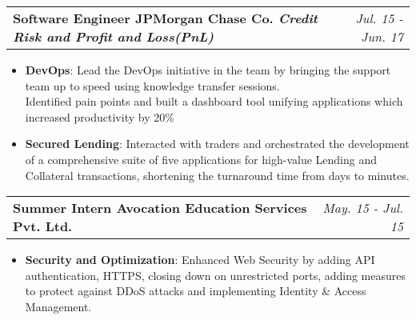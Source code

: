 \documentclass[a4paper,10pt]{article}
\makeatletter
\newcommand{\resumeItem}[2]{
  \vspace{-0.5pt} \item\small{
    \textbf{#1}{: #2}
  }
}
\newcommand{\resumeSubheading}[3]{
	\item
	\textbf{#2} \textbar{} \textbf{#1} \hfill \textit{#3}
}
\newcommand{\projectHeading}[2]{
  \item
    \begin{tabular*}{0.97\textwidth}{l@{\extracolsep{\fill}}r}
      \large{\textbf{#1}} & \textit{\small #2} \\
    \end{tabular*}\vspace{-1.5pt}
}
\newcommand{\resumeItemListStart}{\vspace{-1pt}\begin{itemize}[leftmargin=*]\setlength\itemsep{.5pt}}
\newcommand{\resumeItemListEnd}{\end{itemize}}
\makeatother
\begin{document}
  
    \projectHeading
      {Software Engineer \textbar{} JPMorgan Chase Co. \textbar{} \textit{\small Credit Risk and Profit and Loss(PnL)}}
     {Jul. 15 - Jun. 17}
      \resumeItemListStart
        \resumeItem{DevOps}
        {Lead the DevOps initiative in the team by bringing the support team up to speed using knowledge transfer sessions. \\
        Identified pain points and built a dashboard tool unifying applications which increased productivity by 20\%}
        \resumeItem{Secured Lending}
          {Interacted with traders and orchestrated the development of a comprehensive suite of five applications for high-value Lending and Collateral transactions, shortening the turnaround time from days to minutes.}
      \resumeItemListEnd
      
   
    \projectHeading{Summer Intern \textbar{} Avocation Education Services Pvt. Ltd.}
   {May. 15 - Jul. 15}
   \resumeItemListStart
   		\resumeItem{Security and Optimization}
   		{Enhanced Web Security by adding API authentication, HTTPS, closing down on unrestricted ports, adding measures to protect against DDoS attacks and implementing Identity \& Access Management.}
   \resumeItemListEnd
%   

      
 
\end{document}
